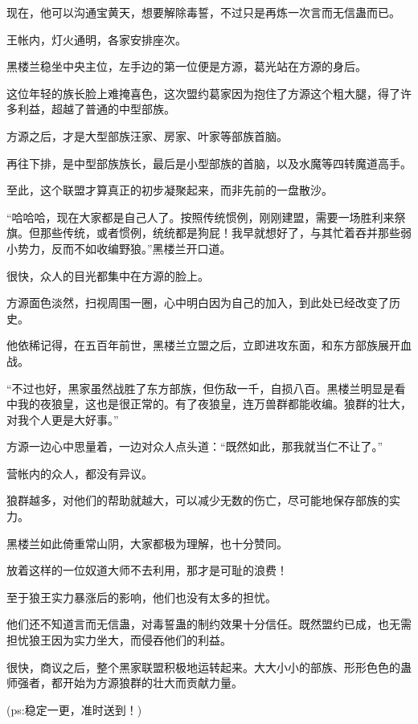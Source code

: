 \begin{this_body}
现在，他可以沟通宝黄天，想要解除毒誓，不过只是再炼一次言而无信蛊而已。

王帐内，灯火通明，各家安排座次。

黑楼兰稳坐中央主位，左手边的第一位便是方源，葛光站在方源的身后。

这位年轻的族长脸上难掩喜色，这次盟约葛家因为抱住了方源这个粗大腿，得了许多利益，超越了普通的中型部族。

方源之后，才是大型部族汪家、房家、叶家等部族首脑。

再往下排，是中型部族族长，最后是小型部族的首脑，以及水魔等四转魔道高手。

至此，这个联盟才算真正的初步凝聚起来，而非先前的一盘散沙。

“哈哈哈，现在大家都是自己人了。按照传统惯例，刚刚建盟，需要一场胜利来祭旗。但那些传统，或者惯例，统统都是狗屁！我早就想好了，与其忙着吞并那些弱小势力，反而不如收编野狼。”黑楼兰开口道。

很快，众人的目光都集中在方源的脸上。

方源面色淡然，扫视周围一圈，心中明白因为自己的加入，到此处已经改变了历史。

他依稀记得，在五百年前世，黑楼兰立盟之后，立即进攻东面，和东方部族展开血战。

“不过也好，黑家虽然战胜了东方部族，但伤敌一千，自损八百。黑楼兰明显是看中我的夜狼皇，这也是很正常的。有了夜狼皇，连万兽群都能收编。狼群的壮大，对我个人更是大好事。”

方源一边心中思量着，一边对众人点头道：“既然如此，那我就当仁不让了。”

营帐内的众人，都没有异议。

狼群越多，对他们的帮助就越大，可以减少无数的伤亡，尽可能地保存部族的实力。

黑楼兰如此倚重常山阴，大家都极为理解，也十分赞同。

放着这样的一位奴道大师不去利用，那才是可耻的浪费！

至于狼王实力暴涨后的影响，他们也没有太多的担忧。

他们还不知道言而无信蛊，对毒誓蛊的制约效果十分信任。既然盟约已成，也无需担忧狼王因为实力坐大，而侵吞他们的利益。

很快，商议之后，整个黑家联盟积极地运转起来。大大小小的部族、形形色色的蛊师强者，都开始为方源狼群的壮大而贡献力量。

(ps:稳定一更，准时送到！)

\end{this_body}

